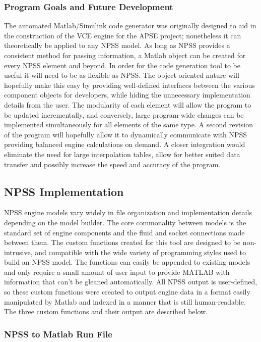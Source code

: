 \documentclass[heading.tex]{subfiles}
\begin{document}
\subsubsection{Program Goals and Future Development}

The automated Matlab/Simulink code generator was originally designed to aid in the construction of the VCE engine for the APSE project; nonetheless it can theoretically be applied to any NPSS model. As long as NPSS provides a consistent method for passing information, a Matlab object can be created for every NPSS element and beyond. In order for the code generation tool to be useful it will need to be as flexible as NPSS. The object-oriented nature will hopefully make this easy by providing well-defined interfaces between the various component objects for developers, while hiding the unnecessary implementation details from the user. The modularity of each element will allow the program to be updated incrementally, and conversely, large program-wide changes can be implemented simultaneously for all elements of the same type. 
	A second revision of the program will hopefully allow it to dynamically communicate with NPSS providing balanced engine calculations on demand. A closer integration would eliminate the need for large interpolation tables, allow for better suited data transfer and possibly increase the speed and accuracy of the program.

\subsection{NPSS Implementation}

NPSS engine models vary widely in file organization and implementation details depending on the model builder. The core commonality between models is the standard set of engine components and the fluid and socket connections made between them. The custom functions created for this tool are designed to be non-intrusive, and compatible with the wide variety of programming styles used to build an NPSS model. The functions can easily be appended to existing models and only require a small amount of user input to provide MATLAB with information that can’t be gleaned automatically. All NPSS output is user-defined, so these custom functions were created to output engine data in a format easily manipulated by Matlab and indexed in a manner that is still human-readable. The three custom functions and their output are described below.

\subsubsection{NPSS to Matlab Run File}
\end{document}
